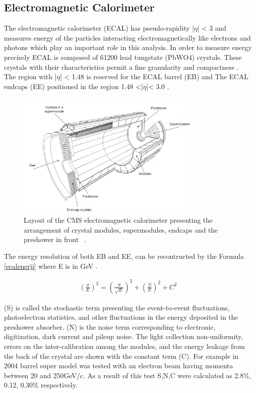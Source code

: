 \documentclass[12pt,oneandhalf,chaparabic,phys,ms,eng]{metu}
\begin{document}
\subsection{Electromagnetic Calorimeter}

The electromagnetic calorimeter (ECAL) has pseudo-rapidity |$\eta$| < 3 and measures energy of the particles interacting electromagnetically like electrons and photons which play an important role in this analysis. In order to measure energy precisely ECAL is composed of 61200 lead tungstate (PbWO4) crystals. These crystals with their characteristics permit a fine granularity and compactness \cite{R16}. The region with |$\eta$| < 1.48 is reserved for the ECAL barrel (EB) and The ECAL endcaps (EE) positioned in the region 1.48 <|$\eta$|< 3.0 . 

\begin{figure}  [!hbt]
\centering
    \includegraphics[width=0.8\textwidth]{ECAL}
    \caption{\label{ECAL}Layout of the CMS electromagnetic calorimeter presenting the arrangement of crystal modules, supermodules, endcaps and the preshower in front ~\cite{R16}.}
\end{figure}

The energy resolution of both EB and EE, can be recontructed by the Formula \ref{ecalenerji} where E is in GeV \cite{R16}. 

\begin{eqnarray}
\label{ecalenerji}
	(\frac{\sigma}{E})^2 = (\frac{S}{\sqrt{E}})^2 + (\frac{N}{E})^2 + C^2
\end{eqnarray}

(S) is called the stochastic term presenting the event-to-event fluctuations, photoelectron statistics, and other fluctuations in the energy deposited in the preshower absorber. (N) is the noise term corresponding to electronic, digitization, dark current and pileup noise.  The light collection non-uniformity, errors on the inter-calibration among the modules, and the energy leakage from the back of the crystal are shown with the constant term (C). For example in 2004 barrel super model was tested with an electron beam having momenta between 20 and 250GeV/c. As a result of this test S,N,C were calculated as 2.8$\%$, 0.12, 0.30$\%$ respectively.
\end{document}
